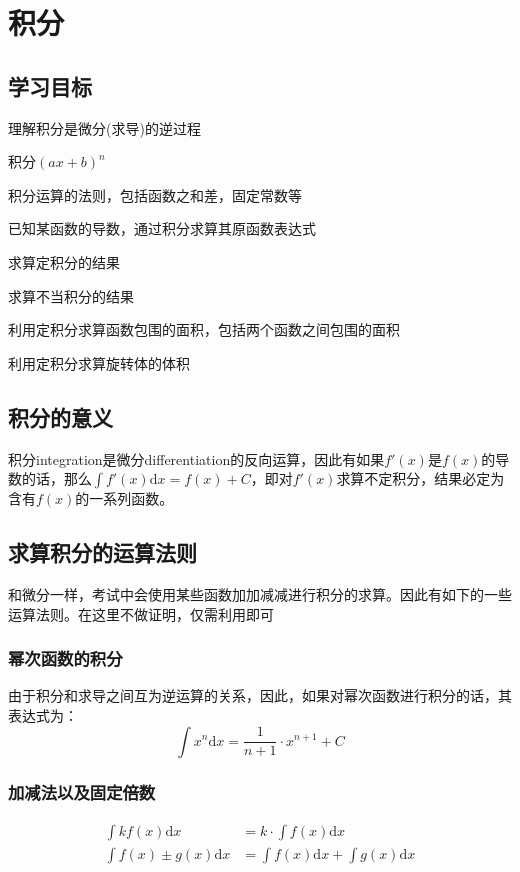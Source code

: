 \chapter{积分}
\label{ch:Integration}

\section*{学习目标}
\begin{todolist}
	\item 理解积分是微分(求导)的逆过程
	\item 积分$(ax+b)^n$
	\item 积分运算的法则，包括函数之和差，固定常数等
	\item 已知某函数的导数，通过积分求算其原函数表达式
	\item 求算定积分的结果
	\item 求算不当积分的结果
	\item 利用定积分求算函数包围的面积，包括两个函数之间包围的面积
	\item 利用定积分求算旋转体的体积
\end{todolist}
\clearpage


\section{积分的意义}
\label{sec:Meaning of Integration}
积分integration是微分differentiation的反向运算，因此有如果$f'(x)$是$f(x)$的导数的话，那么$\int f'(x)\mathrm{d} x=f(x)+C$，即对$f'(x)$求算不定积分，结果必定为含有$f(x)$的一系列函数。
\clearpage


\section{求算积分的运算法则}
\label{sec:Operation rules for integration}
和微分一样，考试中会使用某些函数加加减减进行积分的求算。因此有如下的一些运算法则。在这里不做证明，仅需利用即可

\subsection*{幂次函数的积分}
由于积分和求导之间互为逆运算的关系，因此，如果对幂次函数进行积分的话，其表达式为：
\[
	\int x^n \mathrm{d} x= \frac{1}{n+1} \cdot  x^{n+1} + C
\]

\subsection*{加减法以及固定倍数}
\begin{align*}
	\int kf(x)\mathrm{d} x &= k\cdot \int f(x)\mathrm{d} x\\
	\int f(x)\pm g(x) \mathrm{d} x &=\int f(x) \mathrm{d} x+ \int g(x) \mathrm{d} x
\end{align*}


